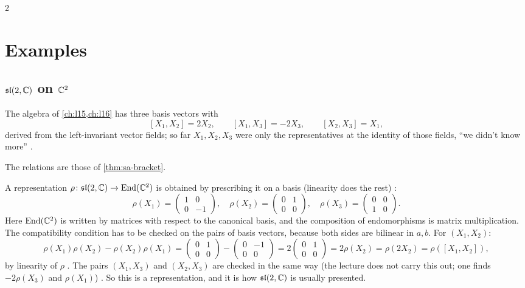 \begin{paracol}{2}
\section{Examples}\label{sec:rp-examples}

\subsection{$\mathfrak{sl}(2,\mathbb{C})$ on $\mathbb{C}^2$}\label{sec:rp-sl2}
The algebra of \cref{ch:l15,ch:l16} has three basis vectors with
\[
  [X_1,X_2]=2X_2,\qquad[X_1,X_3]=-2X_3,\qquad[X_2,X_3]=X_1 ,
\]
derived from the left-invariant vector fields; so far $X_1,X_2,X_3$ were only the representatives at the identity of those fields, ``we didn't know more''  .
\begin{recall}
The relations are those of \cref{thm:sa-bracket}.
\end{recall}
A representation $\rho\colon\mathfrak{sl}(2,\mathbb{C})\to\mathrm{End}(\mathbb{C}^2)$ is obtained by prescribing it on a basis (linearity does the rest)  :
\[
  \rho(X_1)=\begin{pmatrix}1&0\\0&-1\end{pmatrix},\quad
  \rho(X_2)=\begin{pmatrix}0&1\\0&0\end{pmatrix},\quad
  \rho(X_3)=\begin{pmatrix}0&0\\1&0\end{pmatrix}.
\]
Here $\mathrm{End}(\mathbb{C}^2)$ is written by matrices with respect to the canonical basis, and the composition of endomorphisms is matrix multiplication. The compatibility condition has to be checked on the pairs of basis vectors, because both sides are bilinear in $a,b$. For $(X_1,X_2)$:
\[
  \rho(X_1)\rho(X_2)-\rho(X_2)\rho(X_1)=\begin{pmatrix}0&1\\0&0\end{pmatrix}-\begin{pmatrix}0&-1\\0&0\end{pmatrix}=2\begin{pmatrix}0&1\\0&0\end{pmatrix}=2\rho(X_2)=\rho(2X_2)=\rho([X_1,X_2]),
\]
by linearity of $\rho$    . The pairs $(X_1,X_3)$ and $(X_2,X_3)$ are checked in the same way (the lecture does not carry this out; one finds $-2\rho(X_3)$ and $\rho(X_1)$) . So this is a representation, and it is how $\mathfrak{sl}(2,\mathbb{C})$ is usually presented.


\end{paracol}
